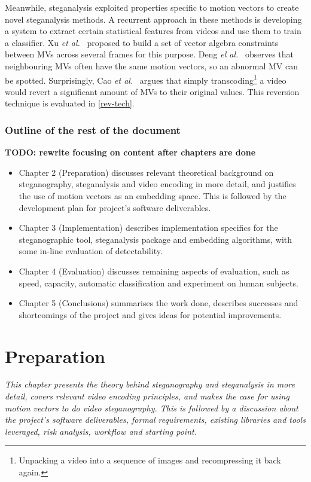 \documentclass[12pt,british,twoside,notitlepage,usenames,dvipsnames,hypens,final]{report}
\numberwithin{equation}{section}
\numberwithin{figure}{section}
\begin{document}
Meanwhile, steganalysis exploited properties specific to motion vectors to create novel steganalysis methods. A recurrent approach in these methods is developing a system to extract certain statistical features from videos and use them to train a classifier. Xu \emph{et al.}~\cite{xu2013video} proposed to build a set of vector algebra constraints between MVs across several frames for this purpose. Deng \emph{el al.}~\cite{deng2012digital} observes that neighbouring MVs often have the same motion vectors, so an abnormal MV can be spotted. Surprisingly, Cao \emph{et al.}~\cite{cao2012video} argues that simply transcoding\footnote{Unpacking a video into a sequence of images and recompressing it back again.} a video would revert a significant amount of MVs to their original values. This reversion technique is evaluated in \ref{rev-tech}.

\subsection*{Outline of the rest of the document}
\textbf{TODO: rewrite focusing on content after chapters are done}
\begin{itemize}
\item Chapter 2 (Preparation) discusses relevant theoretical background on steganography, steganalysis and video encoding in more detail, and justifies the use of motion vectors as an embedding space. This is followed by the development plan for project's software deliverables. 
\item Chapter 3 (Implementation) describes implementation specifics for the steganographic tool, steganalysis package and embedding algorithms, with some in-line evaluation of detectability.
\item Chapter 4 (Evaluation) discusses remaining aspects of evaluation, such as speed, capacity, automatic classification and experiment on human subjects.
\item Chapter 5 (Conclusions) summarises the work done, describes successes and shortcomings of the project and gives ideas for potential improvements.
\end{itemize}
 

\cleardoublepage
\chapter{Preparation}

\textit{This chapter presents the theory behind steganography and steganalysis in more detail, covers relevant video encoding principles, and makes the case for using motion vectors to do video steganography. This is followed by a discussion about the project's software deliverables, formal requirements, existing libraries and tools leveraged, risk analysis, workflow and starting point.}
\end{document}
